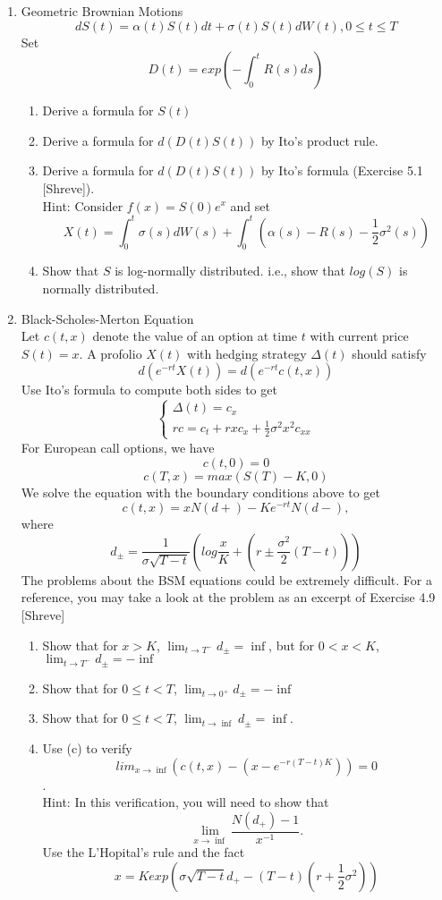 \documentclass[12pt]{article}
\begin{document}
\begin{enumerate}
\begin{enumerate}
\end{enumerate}
\newpage
\item Geometric Brownian Motions
\[dS(t) = \alpha(t)S(t)dt+\sigma(t)S(t)dW(t), 0\leq t\leq T\]
Set 
\[ D(t) = exp\left(-\int_0^t R(s)ds\right)\]
\begin{enumerate}
\item Derive a formula for $S(t)$
\item Derive a formula for $d(D(t)S(t))$ by Ito's product rule.
\item Derive a formula for $d(D(t)S(t))$ by Ito's formula (Exercise 5.1 [Shreve]). 
\\
Hint: Consider $f(x) = S(0)e^x$ and set 
\[
X(t) = \int_0^t \sigma(s)dW(s) + \int_0^t \left(\alpha(s)-R(s)-\frac12\sigma^2(s) \right)
\]
\item Show that $S$ is log-normally distributed. i.e., show that $log(S)$ is normally distributed.
\end{enumerate}
\newpage
\item Black-Scholes-Merton Equation
\\
Let $c(t,x)$ denote the value of an option at time $t$ with current price $S(t)=x$. A profolio $X(t)$ with hedging strategy $\Delta(t)$ should satisfy
\[
d(e^{-rt}X(t)) = d(e^{-rt}c(t,x))
\]
Use Ito's formula to compute both sides to get
\[
\left\{
\begin{array}{l}
\Delta(t) = c_x \\
rc = c_t +rxc_x + \frac12 \sigma^2 x^2 c_{xx}
\end{array}
\right.
\]
For European call options, we have
\[
c(t,0) = 0
\]
\[
c(T,x) = max(S(T)-K, 0)
\]
We solve the equation with the boundary conditions above to get 
\[
c(t,x)=xN(d+)-Ke^{-rt}N(d-),
\]
where
\[
d_{\pm} = \frac1{\sigma\sqrt{T-t}} \left(log \frac xK + \left(r\pm \frac {\sigma^2}{2}(T-t) \right) \right)
\]
The problems about the BSM equations could be extremely difficult. For a reference, you may take a look at the problem as an excerpt of Exercise 4.9 [Shreve]
\begin{enumerate}
\item Show that for $x>K$, $\lim_{t\to T^-}d_{\pm}=\inf$, but for $0< x< K$,  $\lim_{t\to T^-}d_{\pm}=-\inf$
\item Show that for $0\leq t<T$,  $\lim_{t\to 0^+}d_{\pm}=-\inf$
\item Show that for $0\leq t<T$,  $\lim_{t\to \inf}d_{\pm}=\inf$.
\item Use (c) to verify \[ lim_{x\to\inf} \left(c(t,x)-(x-e^{-r(T-t)K})\right)=0 \]. 
\\
Hint: In this verification, you will need to show that 
\[
\lim_{x\to\inf} \frac{N(d_+)-1}{x^{-1}}.
\]
Use the L'Hopital's rule and the fact
\[
x=K exp\left(\sigma\sqrt{T-t}d_+ - (T-t)\left(r+\frac12\sigma^2\right) \right)
\]
\end{enumerate}
\end{enumerate}
\end{document}

